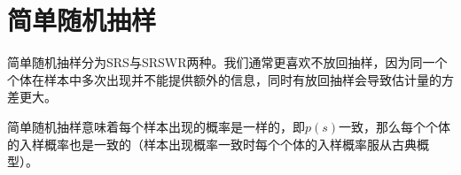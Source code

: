 \chapter{简单随机抽样}

简单随机抽样分为\gls{SRS}与\gls{SRSWR}两种。我们通常更喜欢不放回抽样，因为同一个个体在样本中多次出现并不能提供额外的信息，同时有放回抽样会导致估计量的方差更大。\par
简单随机抽样意味着每个样本出现的概率是一样的，即$p(s)$一致，那么每个个体的入样概率也是一致的（样本出现概率一致时每个个体的入样概率服从古典概型）。







